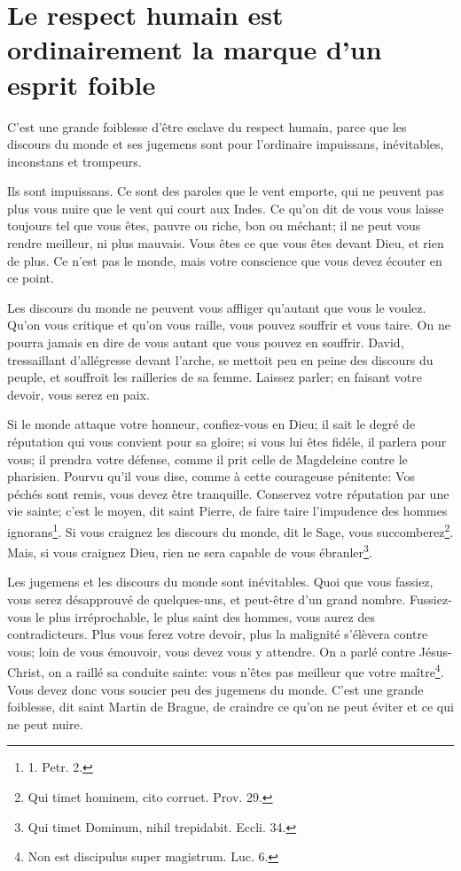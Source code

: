 \documentclass[instructions.tex]{subfiles}
\begin{document}
 
\chapter{Le respect humain est ordinairement la marque d'un esprit foible}
 
C'est une grande foiblesse d'être esclave du respect humain, parce que les discours du monde et ses jugemens sont pour l'ordinaire impuissans, inévitables, inconstans et trompeurs.

\primo Ils sont impuissans. Ce sont des paroles que le vent emporte, qui ne peuvent pas plus vous nuire que le vent qui court aux Indes. Ce qu'on dit de vous vous laisse toujours tel que vous êtes, pauvre ou riche, bon ou méchant; il ne peut vous rendre meilleur, ni plus mauvais. Vous êtes ce que vous êtes devant Dieu, et rien de plus. Ce n'est pas le monde, mais votre conscience que vous devez écouter en ce point.

Les discours du monde ne peuvent vous affliger qu'autant que vous le voulez. Qu'on vous critique et qu'on vous raille, vous pouvez souffrir et vous taire. On ne pourra jamais en dire de vous autant que vous pouvez en souffrir. David, tressaillant d'allégresse devant l'arche, se mettoit peu en peine des discours du peuple, et souffroit les railleries de sa femme. Laissez parler; en faisant votre devoir, vous serez en paix.

Si le monde attaque votre honneur, confiez-vous en Dieu; il sait le degré de réputation qui vous convient pour sa gloire; si vous lui êtes fidéle, il parlera pour vous; il prendra votre défense, comme il prit celle de Magdeleine contre le pharisien. Pourvu qu'il vous dise, comme à cette courageuse pénitente: Vos péchés sont remis, vous devez être tranquille. Conservez votre réputation par une vie sainte; c'est le moyen, dit saint Pierre, de faire taire l'impudence des hommes ignorans\footnote{1. Petr. 2.}. Si vous craignez les discours du monde, dit le Sage, vous succomberez\footnote{Qui timet hominem, cito corruet. Prov. 29.}. Mais, si vous craignez Dieu, rien ne sera capable de vous ébranler\footnote{Qui timet Dominum, nihil trepidabit. Eccli. 34.}.

\secundo Les jugemens et les discours du monde sont inévitables. Quoi que vous fassiez, vous serez désapprouvé de quelques-uns, et peut-être d'un grand nombre. Fussiez-vous le plus irréprochable, le plus saint des hommes, vous aurez des contradicteurs. Plus vous ferez votre devoir, plus la malignité s'élèvera contre vous; loin de vous émouvoir, vous devez vous y attendre. On a parlé contre Jésus-Christ, on a raillé sa conduite sainte: vous n'êtes pas meilleur que votre maître\footnote{Non est discipulus super magistrum. Luc. 6.}. Vous devez donc vous soucier peu des jugemens du monde. C'est une grande foiblesse, dit saint Martin de Brague, de craindre ce qu'on ne peut éviter et ce qui ne peut nuire.
\end{document}
